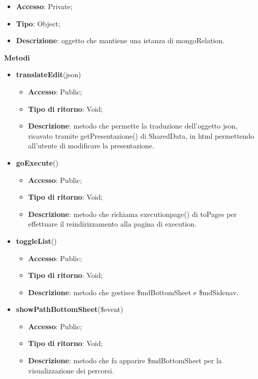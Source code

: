 {{\begin{itemize}
			\begin{itemize}
				\item \textbf{Accesso}: Private;
				\item \textbf{Tipo}: Object;
				\item \textbf{Descrizione}: oggetto che mantiene una istanza di mongoRelation.
			\end{itemize}
	    \end{itemize}
		\textbf{Metodi}
		\begin{itemize}
			\item \textbf{translateEdit}(json)
			\begin{itemize}
				\item \textbf{Accesso}: Public;
				\item \textbf{Tipo di ritorno}: Void;
				\item \textbf{Descrizione}: metodo che permette la traduzione dell'oggetto json, ricavato tramite getPresentazione() di SharedData, in html permettendo all'utente di modificare la presentazione.
			\end{itemize}
			\item \textbf{goExecute}()
			\begin{itemize}
				\item \textbf{Accesso}: Public;
				\item \textbf{Tipo di ritorno}: Void;
				\item \textbf{Descrizione}: metodo che richiama executionpage() di toPages per effettuare il reindirizzamento alla pagina di execution.
			\end{itemize}
			\item \textbf{toggleList}()
			\begin{itemize}
				\item \textbf{Accesso}: Public;
				\item \textbf{Tipo di ritorno}: Void;
				\item \textbf{Descrizione}: metodo che gestisce \$mdBottomSheet e \$mdSidenav.
			\end{itemize}
			\item \textbf{showPathBottomSheet}(\$event)
			\begin{itemize}
				\item \textbf{Accesso}: Public;
				\item \textbf{Tipo di ritorno}: Void;
				\item \textbf{Descrizione}: metodo che fa apparire \$mdBottomSheet per la visualizzazione dei percorsi.
			\end{itemize}

\end{itemize}}}
